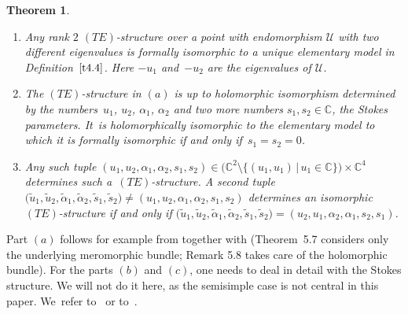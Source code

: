 \documentclass[pdftex]{sigma}%
\numberwithin{equation}{section}
\numberwithin{figure}{section}
\newcommand{\C}{{\mathbb C}}
\newcommand{\UU}{{\mathcal U}}
\newcommand{\www}{\widetilde}
\newtheorem{Theorem}{Theorem}[section]
\begin{document}
\begin{Theorem}\label{t4.5}\qquad

\begin{enumerate}\itemsep=0pt
\item[$(a)$] Any rank $2$ $(TE)$-structure over a point with
endomorphism $\UU$ with two different
eigen\-va\-lues is formally isomorphic to a unique
elementary model in Definition~$\ref{t4.4}$.
Here $-u_1$ and~$-u_2$ are the eigenvalues of $\UU$.

\item[$(b)$] The $(TE)$-structure in $(a)$ is up to holomorphic
isomorphism determined by the numbers~$u_1$, $u_2$, $\alpha_1$, $\alpha_2$ and two more numbers
$s_1,s_2\in\C$, the Stokes parameters. It~is holomorphically isomorphic to the elementary
model to which it is formally isomorphic if and only if~$s_1=s_2=0$.

\item[$(c)$] Any such tuple $(u_1,u_2,\alpha_1,\alpha_2,s_1,s_2)
\in \big(\C^2\setminus \{(u_1,u_1)\,|\, u_1\in\C\}\big)\times\C^4$
determines such a~$(TE)$-structure.
A second tuple $\big(\www u_1,\www u_2,\www\alpha_1,
\www \alpha_2,\www s_1,\www s_2\big)
\neq (u_1,u_2,\alpha_1,\alpha_2,s_1,s_2)$
determines an isomorphic $(TE)$-structure if and only
if $\big(\www u_1,\www u_2,\www\alpha_1,\www \alpha_2,\www s_1,\www s_2\big)
=(u_2,u_1,\alpha_2,\alpha_1,s_2,s_1)$.
\end{enumerate}
\end{Theorem}

Part $(a)$ follows for example from
\cite[Chapter~II, Theorem~5.7]{Sa02} together with
\cite[Chapter~II, Remark 5.8]{Sa02} (Theorem~5.7 considers
only the underlying meromorphic bundle;
Remark 5.8 takes care of the holomorphic bundle).
For the parts $(b)$ and $(c)$, one needs to deal in detail
with the Stokes structure. We will not do it here,
as the semisimple case is not central in this paper.
We~refer to~\cite[Chapter~II, Sections~5 and~6]{Sa02}
or to~\cite{HS11}.
\end{document}
